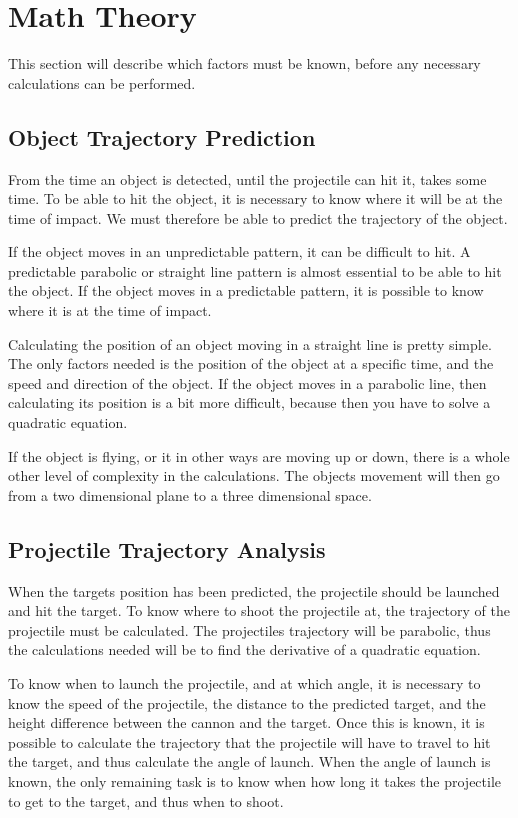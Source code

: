 \section{Math Theory}
This section will describe which factors must be known, before any necessary calculations can be performed.

\subsection{Object Trajectory Prediction}
From the time an object is detected, until the projectile can hit it, takes some time. To be able to hit the object, it is necessary to know where it will be at the time of impact. We must therefore be able to predict the trajectory of the object.

If the object moves in an unpredictable pattern, it can be difficult to hit. A predictable parabolic or straight line pattern is almost essential to be able to hit the object. If the object moves in a predictable pattern, it is possible to know where it is at the time of impact.

Calculating the position of an object moving in a straight line is pretty simple. The only factors needed is the position of the object at a specific time, and the speed and direction of the object. If the object moves in a parabolic line, then calculating its position is a bit more difficult, because then you have to solve a quadratic equation.

If the object is flying, or it in other ways are moving up or down, there is a whole other level of complexity in the calculations. The objects movement will then go from a two dimensional plane to a three dimensional space.

\subsection{Projectile Trajectory Analysis}
When the targets position has been predicted, the projectile should be launched and hit the target. To know where to shoot the projectile at, the trajectory of the projectile must be calculated.
The projectiles trajectory will be parabolic, thus the calculations needed will be to find the derivative of a quadratic equation.

To know when to launch the projectile, and at which angle, it is necessary to know the speed of the projectile, the distance to the predicted target, and the height difference between the cannon and the target. Once this is known, it is possible to calculate the trajectory that the projectile will have to travel to hit the target, and thus calculate the angle of launch.
When the angle of launch is known, the only remaining task is to know when how long it takes the projectile to get to the target, and thus when to shoot.

